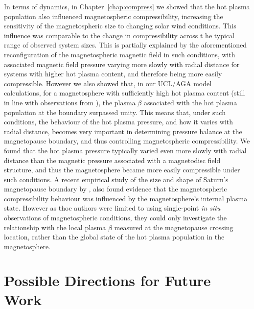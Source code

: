 In terms of dynamics, in Chapter~\ref{chap:compress} we showed that the hot plasma population also influenced magnetospheric compressibility, increasing the sensitivity of the magnetospheric size to changing solar wind conditions. This influence was comparable to the change in compressibility across t he typical range of observed system sizes. This is partially explained by the aforementioned reconfiguration of the magnetospheric magnetic field in such conditions, with associated magnetic field pressure varying more slowly with radial distance for systems with higher hot plasma content, and therefore being more easily compressible. However we also showed that, in our UCL/AGA model calculations, for a magnetosphere with sufficiently high hot plasma content (still in line with observations from \citet{sergis2007}), the plasma $\beta$ associated with the hot plasma population at the boundary surpassed unity. This means that, under such conditions, the behaviour of the hot plasma pressure, and how it varies with radial distance, becomes very important in determining pressure balance at the magnetopause boundary, and thus controlling magnetospheric compressibility. We found that the hot plasma pressure typically varied even more slowly with radial distance than the magnetic pressure associated with a magnetodisc field structure, and thus the magnetosphere became more easily compressible under such conditions. A recent empirical study of the size and shape of Saturn's magnetopause boundary by  \citet{pilkington2015}, also found evidence that the magnetospheric compressibility behaviour was influenced by the magnetosphere's internal plasma state. However as thoe authors were limited to using single-point \textit{in situ} observations of magnetospheric conditions, they could only investigate the relationship with the local plasma $\beta$ measured at the magnetopause crossing location, rather than the global state of the hot plasma population in the magnetosphere.

\section{Possible Directions for Future Work}
